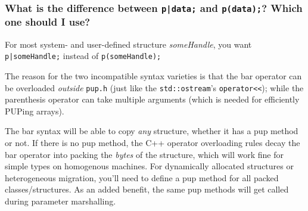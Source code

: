 \subsubsection{What is the difference between {\tt p|data;} and
{\tt p(data);}? Which one should I use?}

For most system- and user-defined structure {\em someHandle}, you want
{\tt p|someHandle;} instead of {\tt p(someHandle);}

The reason for the two incompatible syntax varieties is that the bar
operator can be overloaded {\em outside} {\tt pup.h} (just like the
{\tt std::ostream}'s {\tt operator{<}<});
while the parenthesis operator can take multiple arguments (which is needed
for efficiently PUPing arrays).

The bar syntax will be able to copy {\em any} structure, whether it
has a pup method or not. If there is no pup method, the C++ operator overloading
rules decay the bar operator into packing the {\em bytes} of the structure,
which will work fine for simple types on homogenous machines. For dynamically
allocated structures or heterogeneous migration, you'll need to define
a pup method for all packed classes/structures. As an added benefit, the
same pup methods will get called during parameter marshalling.
